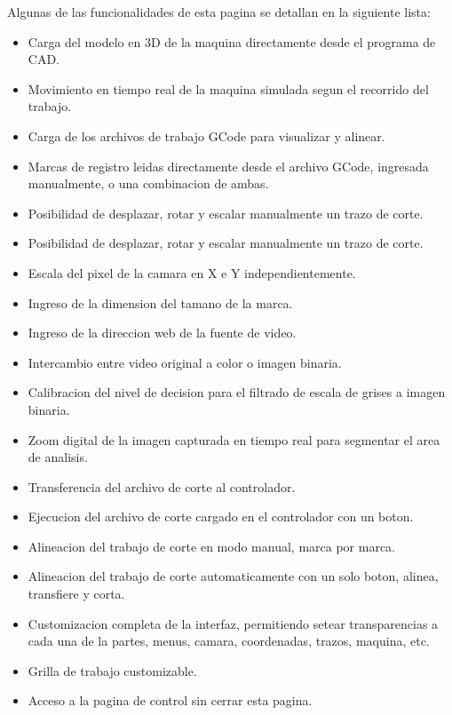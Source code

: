 Algunas de las funcionalidades de esta pagina se detallan en la siguiente lista:
\begin{itemize}
   \item{Carga del modelo en 3D de la maquina directamente desde el programa de CAD. }
   \item{Movimiento en tiempo real de la maquina simulada segun el recorrido del trabajo.}
   \item{Carga de los archivos de trabajo GCode para visualizar y alinear.}
   \item{Marcas de registro leidas directamente desde el archivo GCode, ingresada manualmente, o una combinacion de ambas.}
   \item{Posibilidad de desplazar, rotar y escalar manualmente un trazo de corte.}
   \item{Posibilidad de desplazar, rotar y escalar manualmente un trazo de corte.}

   \item{Escala del pixel de la camara en X e Y independientemente.}
   \item{Ingreso de la dimension del tamano de la marca.}
   \item{Ingreso de la direccion web de la fuente de video.}
   \item{Intercambio entre video original a color o imagen binaria.}
   \item{Calibracion del nivel de decision para el filtrado de escala de grises a imagen binaria.}
   \item{Zoom digital de la imagen capturada en tiempo real para segmentar el area de analisis.}
   \item{Transferencia del archivo de corte al controlador.}
   \item{Ejecucion del archivo de corte cargado en el controlador con un boton.}
   \item{Alineacion del trabajo de corte en modo manual, marca por marca.}
   \item{Alineacion del trabajo de corte automaticamente con un solo boton, alinea, transfiere y corta.}
   \item{Customizacion completa de la interfaz, permitiendo setear transparencias a cada una de la partes, menus, camara, coordenadas, trazos, maquina, etc.}
   \item{Grilla de trabajo customizable.}
   \item{Acceso a la pagina de control sin cerrar esta pagina.}
\end{itemize}


